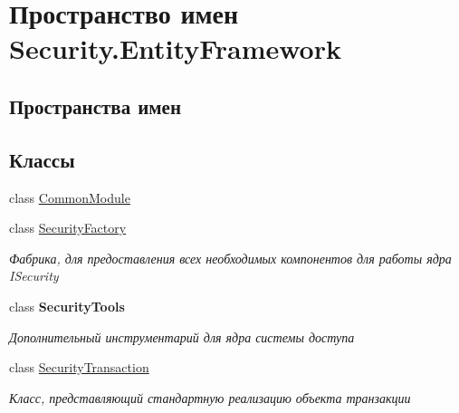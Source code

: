 \hypertarget{namespace_security_1_1_entity_framework}{}\section{Пространство имен Security.\+Entity\+Framework}
\label{namespace_security_1_1_entity_framework}
\subsection*{Пространства имен}
\begin{DoxyCompactItemize}
\end{DoxyCompactItemize}
\subsection*{Классы}
\begin{DoxyCompactItemize}
\item 
class \hyperlink{class_security_1_1_entity_framework_1_1_common_module}{Common\+Module}
\item 
class \hyperlink{class_security_1_1_entity_framework_1_1_security_factory}{Security\+Factory}
\begin{DoxyCompactList}\small\item\em Фабрика, для предоставления всех необходимых компонентов для работы ядра I\+Security \end{DoxyCompactList}\item 
class {\bfseries Security\+Tools}
\begin{DoxyCompactList}\small\item\em Дополнительный инструментарий для ядра системы доступа \end{DoxyCompactList}\item 
class \hyperlink{class_security_1_1_entity_framework_1_1_security_transaction}{Security\+Transaction}
\begin{DoxyCompactList}\small\item\em Класс, представляющий стандартную реализацию объекта транзакции \end{DoxyCompactList}\end{DoxyCompactItemize}
